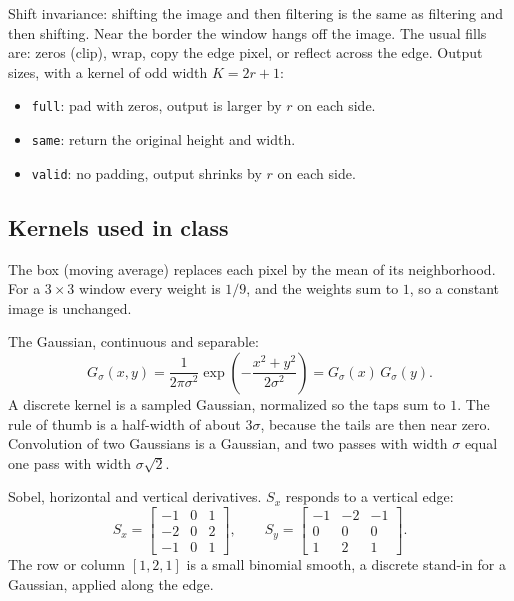 \documentclass[11pt]{article}
\begin{document}
Shift invariance: shifting the image and then filtering is the same as filtering and then shifting. Near the border the window hangs off the image. The usual fills are: zeros (clip), wrap, copy the edge pixel, or reflect across the edge. Output sizes, with a kernel of odd width $K=2r+1$:
\begin{itemize}
\item \texttt{full}: pad with zeros, output is larger by $r$ on each side.
\item \texttt{same}: return the original height and width.
\item \texttt{valid}: no padding, output shrinks by $r$ on each side.
\end{itemize}

\subsection{Kernels used in class}

The box (moving average) replaces each pixel by the mean of its neighborhood. For a $3\times 3$ window every weight is $1/9$, and the weights sum to $1$, so a constant image is unchanged.

The Gaussian, continuous and separable:
\begin{equation}
G_\sigma(x,y)
=
\frac{1}{2\pi\sigma^2}
\exp\!\left(-\frac{x^2+y^2}{2\sigma^2}\right)
=
G_\sigma(x)\,G_\sigma(y).
\end{equation}
A discrete kernel is a sampled Gaussian, normalized so the taps sum to $1$. The rule of thumb is a half-width of about $3\sigma$, because the tails are then near zero. Convolution of two Gaussians is a Gaussian, and two passes with width $\sigma$ equal one pass with width $\sigma\sqrt{2}$.

Sobel, horizontal and vertical derivatives. $S_x$ responds to a vertical edge:
\begin{equation}
S_x=
\begin{bmatrix}
-1 & 0 & 1 \\
-2 & 0 & 2 \\
-1 & 0 & 1
\end{bmatrix},
\qquad
S_y=
\begin{bmatrix}
-1 & -2 & -1 \\
 0 &  0 &  0 \\
 1 &  2 &  1
\end{bmatrix}.
\end{equation}
The row or column $[1,2,1]$ is a small binomial smooth, a discrete stand-in for a Gaussian, applied along the edge.
\end{document}
